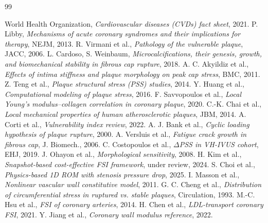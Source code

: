 \documentclass[master,english,final]{kaist-ucs}
\begin{document}
\begin{thebibliography}{99}

 World Health Organization, \textit{Cardiovascular diseases (CVDs) fact sheet}, 2021.
 P. Libby, \textit{Mechanisms of acute coronary syndromes and their implications for therapy}, NEJM, 2013.
 R. Virmani et al., \textit{Pathology of the vulnerable plaque}, JACC, 2006.
 L. Cardoso, S. Weinbaum, \textit{Microcalcifications, their genesis, growth, and biomechanical stability in fibrous cap rupture}, 2018.
 A. C. Akyildiz et al., \textit{Effects of intima stiffness and plaque morphology on peak cap stress}, BMC, 2011.
 Z. Teng et al., \textit{Plaque structural stress (PSS) studies}, 2014.
 Y. Huang et al., \textit{Computational modeling of plaque stress}, 2016.
 F. Savvopoulos et al., \textit{Local Young's modulus--collagen correlation in coronary plaque}, 2020.
 C.-K. Chai et al., \textit{Local mechanical properties of human atherosclerotic plaques}, JBM, 2014.
 A. Corti et al., \textit{Vulnerability index review}, 2022.
 A. J. Bank et al., \textit{Cyclic loading hypothesis of plaque rupture}, 2000.
 A. Versluis et al., \textit{Fatigue crack growth in fibrous cap}, J. Biomech., 2006.
 C. Costopoulos et al., \textit{$\Delta$PSS in VH-IVUS cohort}, EHJ, 2019.
 J. Ohayon et al., \textit{Morphological sensitivity}, 2008.
 H. Kim et al., \textit{Snapshot-based cost-effective FSI framework}, under review, 2024.
 S. Choi et al., \textit{Physics-based 1D ROM with stenosis pressure drop}, 2025.
 I. Masson et al., \textit{Nonlinear vascular wall constitutive model}, 2011.
 G. C. Cheng et al., \textit{Distribution of circumferential stress in ruptured vs. stable plaques}, Circulation, 1993.
 M.-C. Hsu et al., \textit{FSI of coronary arteries}, 2014.
 H. Chen et al., \textit{LDL-transport coronary FSI}, 2021.
 Y. Jiang et al., \textit{Coronary wall modulus reference}, 2022.

\end{thebibliography}
\end{document}
